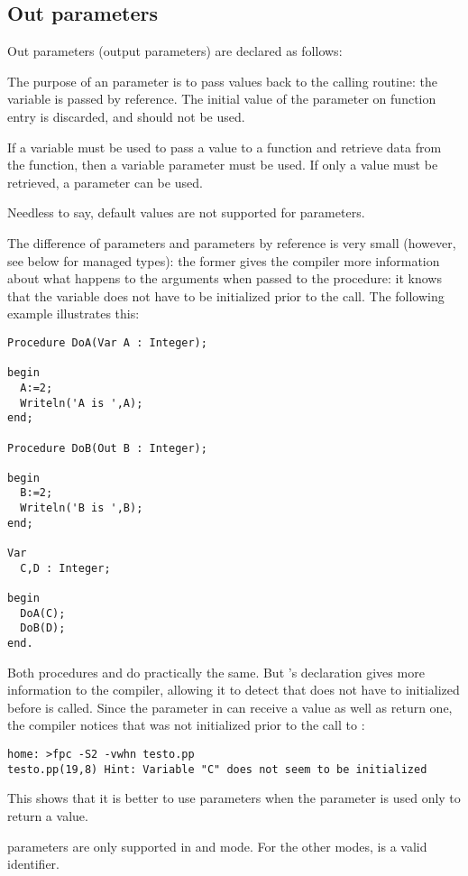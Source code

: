\subsection{Out parameters}
\label{se:outparams}
Out parameters  (output parameters) are declared as follows:

The purpose of an  parameter is to pass values back to the calling
routine: the variable is passed by reference. The initial value of the
parameter on function entry is discarded, and should not be used.

If a variable must be used to pass a value to a function and retrieve data
from the function, then a variable parameter must be used. If only a value
must be retrieved, a  parameter can be used.

Needless to say, default values are not supported for  parameters.

The difference of  parameters and parameters by reference is very small
(however, see below for managed types):
the former gives the compiler more information about what happens to the
arguments when passed to the procedure: it knows that the variable does not
have to be initialized prior to the call. The following example illustrates
this:
\begin{verbatim}
Procedure DoA(Var A : Integer);

begin
  A:=2;
  Writeln('A is ',A);
end;

Procedure DoB(Out B : Integer);

begin
  B:=2;
  Writeln('B is ',B);
end;

Var
  C,D : Integer;

begin
  DoA(C);
  DoB(D);
end.
\end{verbatim}
Both procedures  and  do practically the same. But
's declaration gives more information to the compiler, allowing
it to detect that  does not have to initialized before 
is called. Since the parameter  in  can receive a value as
well as return one, the compiler notices that  was not initialized
prior to the call to :
\begin{verbatim}
home: >fpc -S2 -vwhn testo.pp
testo.pp(19,8) Hint: Variable "C" does not seem to be initialized
\end{verbatim}
This shows that it is better to use  parameters when the parameter
is used only to return a value.

\begin{remark}
 parameters are only supported in  and  mode. For the other
modes,  is a valid identifier.
\end{remark}

